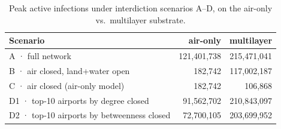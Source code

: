 \begin{table}[t]
\centering
\caption{Peak active infections under interdiction scenarios A--D, on the air-only vs.\ multilayer substrate.}
\label{tab:interdiction}
\begin{tabular}{lrr}
\toprule
Scenario & air-only & multilayer \\
\midrule
A · full network & 121,401,738 & 215,471,041 \\
B · air closed, land+water open & 182,742 & 117,002,187 \\
C · air closed (air-only model) & 182,742 & 106,868 \\
D1 · top-10 airports by degree closed & 91,562,702 & 210,843,097 \\
D2 · top-10 airports by betweenness closed & 72,700,105 & 203,699,952 \\
\bottomrule
\end{tabular}
\end{table}

